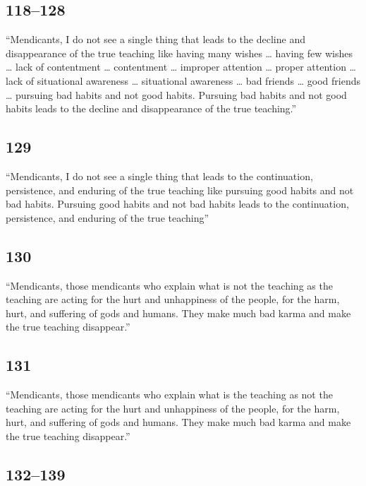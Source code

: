 \documentclass[12pt,openany]{book}%
\begin{document}
\subsection*{118–128 }

“Mendicants, I do not see a single thing that leads to the decline and disappearance of the true teaching like having many wishes … having few wishes … lack of contentment … contentment … improper attention … proper attention … lack of situational awareness … situational awareness … bad friends … good friends … pursuing bad habits and not good habits. Pursuing bad habits and not good habits leads to the decline and disappearance of the true teaching.” 

\subsection*{129 }

“Mendicants, I do not see a single thing that leads to the continuation, persistence, and enduring of the true teaching like pursuing good habits and not bad habits. Pursuing good habits and not bad habits leads to the continuation, persistence, and enduring of the true teaching” 

\subsection*{130 }

“Mendicants, those mendicants who explain what is not the teaching as the teaching are acting for the hurt and unhappiness of the people, for the harm, hurt, and suffering of gods and humans. They make much bad karma and make the true teaching disappear.” 

\subsection*{131 }

“Mendicants, those mendicants who explain what is the teaching as not the teaching are acting for the hurt and unhappiness of the people, for the harm, hurt, and suffering of gods and humans. They make much bad karma and make the true teaching disappear.” 

\subsection*{132–139 }
\end{document}
